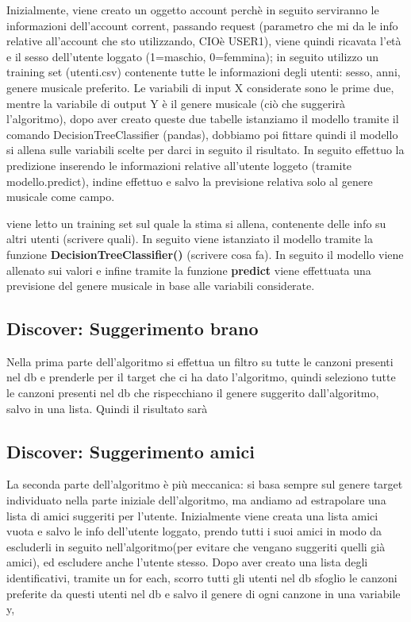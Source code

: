 Inizialmente, viene creato un oggetto account perchè in seguito serviranno le informazioni dell'account corrent, passando request (parametro che 
mi da le info relative all'account che sto utilizzando, CIOè USER1), viene quindi ricavata l'età e il sesso dell'utente loggato (1=maschio, 0=femmina); 
in seguito utilizzo un training set (utenti.csv) contenente tutte le informazioni degli utenti: 
sesso, anni, genere musicale preferito. 
Le variabili di input X considerate sono le prime due, mentre la variabile di output Y è il genere musicale (ciò che suggerirà l'algoritmo),
dopo aver creato queste due tabelle istanziamo il modello tramite il comando DecisionTreeClassifier (pandas), 
dobbiamo poi fittare quindi il modello si allena sulle variabili scelte per darci in seguito il risultato. 
In seguito effettuo la predizione inserendo le informazioni relative all'utente loggeto (tramite modello.predict), indine 
effettuo e salvo la previsione relativa solo al genere musicale come campo. 


viene letto un training set sul quale la stima si allena, contenente delle info
su altri utenti (scrivere quali). In seguito viene istanziato il modello tramite la funzione
\textbf{DecisionTreeClassifier()} (scrivere cosa fa). 
In seguito il modello viene allenato sui valori e infine tramite la funzione 
\textbf{predict} viene effettuata una previsione del genere musicale in base alle variabili considerate. 


\subsection{Discover: Suggerimento brano}
Nella prima parte dell'algoritmo si effettua un filtro su tutte le canzoni presenti nel db e 
prenderle per il target che ci ha dato l'algoritmo, quindi seleziono tutte le canzoni presenti nel db che 
rispecchiano il genere suggerito dall'algoritmo, salvo in una lista. 
Quindi il risultato sarà

\subsection{Discover: Suggerimento amici}
La seconda parte dell'algoritmo è più meccanica: si basa sempre sul genere target individuato nella parte
iniziale dell'algoritmo, ma andiamo ad estrapolare una lista di amici suggeriti per l'utente. 
Inizialmente viene creata una lista amici vuota e salvo le info dell'utente loggato, prendo tutti 
i suoi amici in modo da escluderli in seguito nell'algoritmo(per evitare che vengano suggeriti quelli già amici), ed escludere
anche l'utente stesso. Dopo aver creato una lista degli identificativi, tramite un for each, scorro tutti gli utenti nel db
sfoglio le canzoni preferite da questi utenti nel db e salvo il genere di ogni canzone in una variabile y, 

